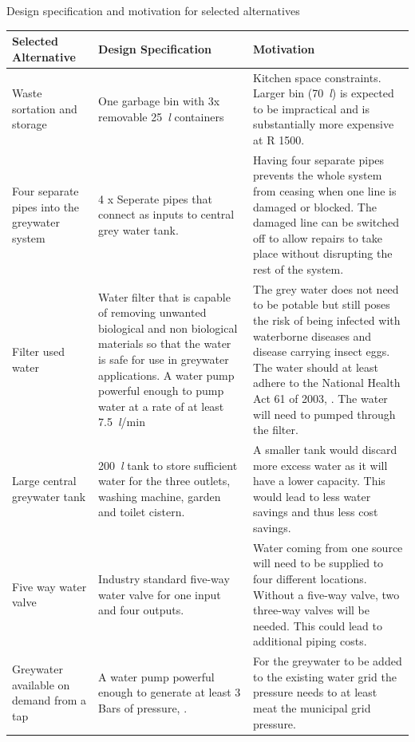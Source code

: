 \documentclass[a4paper,11pt,fleqn]{report}
\begin{document}
\begin{center}
\caption {Design specification and motivation for selected alternatives} \label{tb: Functional_design_specs} 
\begin{longtable}{p{3cm}|p{5.5cm}|p{5.5cm}}\toprule
	{\textbf{Selected Alternative}} & {\textbf{Design Specification}} & {\textbf{Motivation}}\\ \midrule
    \hline
    Waste sortation and storage & One garbage bin with 3x removable 25~\textit{l} containers & 
Kitchen space constraints. Larger bin (70~\textit{l}) is expected to be impractical and is substantially more expensive at R 1500.\\
        \hline
    Four separate pipes into the greywater system & 4 x Seperate pipes that connect as inputs to central grey water tank. & Having four separate pipes prevents the whole system from ceasing when one line is damaged or blocked. The damaged line can be switched off to allow repairs to take place without disrupting the rest of the system.\\
        \hline
    Filter used water & Water filter that is capable of removing unwanted biological and non biological materials so that the water is safe for use in greywater applications.
A water pump powerful enough to pump water at a rate of at least 7.5~\textit{l}/min
 & The grey water does not need to be potable but still poses the risk of being infected with waterborne diseases and disease carrying insect eggs. The water should at least adhere to the National Health Act 61 of 2003, \citep{NHA2003}.
The water will need to pumped through the filter.\\
        \hline
    Large central greywater tank & 200~\textit{l} tank to store sufficient water for the three outlets, washing machine, garden and toilet cistern. & A smaller tank would discard more excess water as it will have a lower capacity. This would lead to less water savings and thus less cost savings.\\
        \hline
    Five way water valve & Industry standard five-way water valve for one input and four outputs. & Water coming from one source will need to be supplied to four different locations. Without a five-way valve, two three-way valves will be needed. This could lead to additional piping costs.\\
            \hline
    Greywater available on demand from a tap & A water pump powerful enough to generate at least 3 Bars of pressure, \citep{Bran2016}. & For the greywater to be added to the existing water grid the pressure needs to at least meat the municipal grid pressure.\\

\end{longtable}
\end{center}
\end{document}
